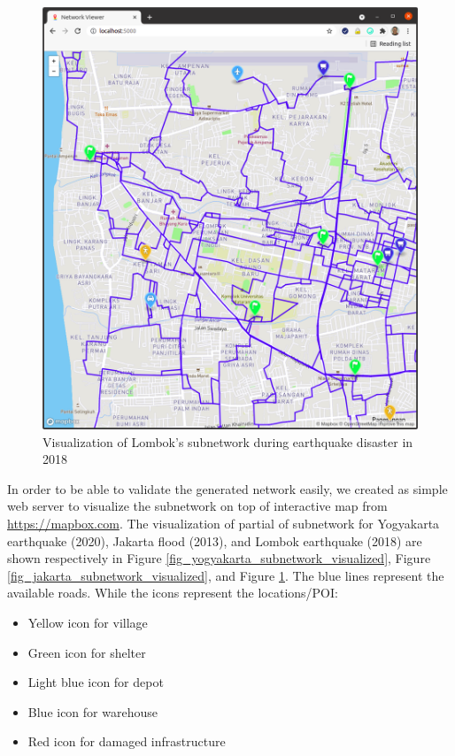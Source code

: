 \documentclass[conference]{IEEEtran}
\begin{document}
\begin{figure}
\centerline{\includegraphics[scale=0.25]{subnetwork-visualization-zoom-1-lombok.png}}
\caption{Visualization of Lombok's subnetwork during earthquake disaster in 2018}
\label{fig_lombok_subnetwork_visualized}
\end{figure}


In order to be able to validate the generated network easily, we created as simple web server to visualize the subnetwork on top of interactive map from \url{https://mapbox.com}. The visualization of partial of subnetwork for Yogyakarta earthquake (2020), Jakarta flood (2013), and Lombok earthquake (2018) are shown respectively in Figure \ref{fig_yogyakarta_subnetwork_visualized}, Figure \ref{fig_jakarta_subnetwork_visualized}, and Figure \ref{fig_lombok_subnetwork_visualized}. The blue lines represent the available roads. While the icons represent the locations/POI: 

\begin{itemize}
\item Yellow icon for village
\item Green icon for shelter
\item Light blue icon for depot
\item Blue icon for warehouse
\item Red icon for damaged infrastructure
\end{itemize}
\end{document}
